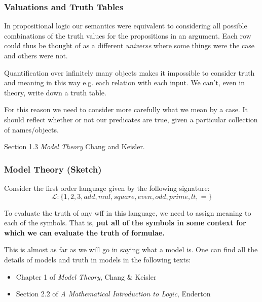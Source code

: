 \documentclass{beamer}
\theoremstyle{indentDefn} \newtheorem{defn}[]{Definition}
\begin{document}
\begin{frame}
	\frametitle{Valuations and Truth Tables}
	
	In propositional logic our semantics were equivalent to considering all possible combinations of the truth values for the propositions in an argument. Each row could thus be thought of as a different \emph{universe} where some things were the case and others were not. 
	
	\vspace{0.5cm}
	
	Quantification over infinitely many objects makes it impossible to consider truth and meaning in this way e.g. each relation with each input. We can't, even in theory, write down a truth table. 
	
	\vspace{0.5cm}
	
	For this reason we need to consider more carefully what we mean by a case. It should reflect whether or not our predicates are true, given a particular collection of names/objects.
	
	\vspace{1cm}
	
	\footnotesize{Section 1.3 \emph{Model Theory} Chang and Keisler.}
	
\end{frame}

\begin{frame}
	\frametitle{Model Theory (Sketch)}
	
	Consider the first order language given by the following signature: 
	$$\mathcal{L}: \{1,2,3,add,mul,square,even,odd,prime,lt,=\}$$
	
	\vspace{0.5cm}
	
	To evaluate the truth of any wff in this language, we need to assign meaning to each of the symbols. That is, {\bf put all of the symbols in some context for which we can evaluate the truth of formulae.}
	
	\vspace{0.5cm}
	
	This is almost as far as we will go in saying what a model is. One can find all the details of models and truth in models in the following texts: 
	
	\begin{itemize}
		\item Chapter 1 of \emph{Model Theory}, Chang \& Keisler 
		\item Section 2.2 of \emph{A Mathematical Introduction to Logic}, Enderton
	\end{itemize}
\end{frame}
\end{document}
